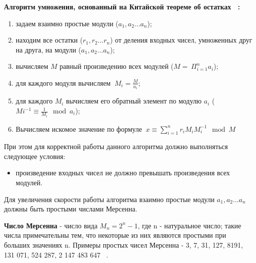 \documentclass[14pt, russian]{scrartcl}
\begin{document}
\Newline
\textbf{Алгоритм умножения, основанный на Китайской теореме об остатках ~\cite{Alghorythm_Chinese}:}
\begin{enumerate}
    \item задаем взаимно простые модули ($a_{1},a_{2}...a_{n}$);
    \item находим все остатки ($r_{1},r_{2}...r_{n}$) от деления входных чисел, умноженных друг на друга, на модули ($a_{1},a_{2}...a_{n}$);
    \item вычисляем $M$ равный произведению всех модулей ($M=\displaystyle\ \Pi_{i=1}^{n}a_{i}$);
    \item для каждого модуля вычисляем  $\displaystyle\ M_{i}=\frac{M}{a_{i}}$;
    \item для каждого $M_{i}$ вычисляем его обратный элемент по модулю $a_{i}$  ($M{i}^{-1}\equiv\frac{1}{M_{i}}\mod a_{i}$);
    \item Вычисляем искомое значение по формуле $\displaystyle\ {x}\equiv \sum_{i=1}^{n} {r}_{i}{M}_{i}{M}_{i}^{-1} \mod {M}$
\end{enumerate}
При этом для корректной работы данного алгоритма должно выполняться следующее условия:
\begin{itemize}
    \item произведение входных чисел не должно превышать произведения всех модулей.
\end{itemize}
Для увеличения скорости работы алгоритма взаимно простые модули $a_{1},a_{2}...a_{n}$ должны быть простыми числами Мерсенна. 
\Newline

\textbf{Число Мерсенна} - число вида $M_{n}=2^{n}-1$, где n - натуральное число; такие числа примечательны тем, что некоторые из них являются простыми при больших значениях n. Примеры простых чисел Мерсенна - 3, 7, 31, 127, 8191, 131 071, 524 287, 2 147 483 647 ~\cite{Mersen}.
\end{document}
